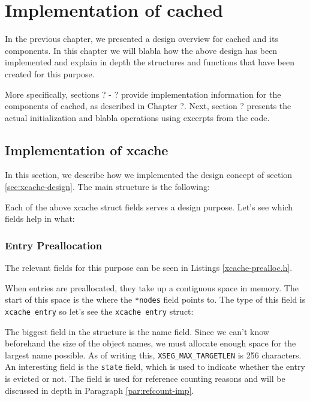 \chapter{Implementation of cached}\label{ch:cached-implementation}

In the previous chapter, we presented a design overview for cached and its 
components. In this chapter we will blabla how the above design has been
implemented and explain in depth the structures and functions that have been 
created for this purpose.

More specifically, sections ? - ? provide implementation information for the 
components of cached, as described in Chapter ?. Next, section ? presents the 
actual initialization and blabla operations using excerpts from the code.

\section{Implementation of xcache}

In this section, we describe how we implemented the design concept of section 
\ref{sec:xcache-design}. The main \xcache structure is the following:


Each of the above xcache struct fields serves a design purpose.
Let's see which fields help in what:

\subsection{Entry Preallocation}

The relevant fields for this purpose can be seen in Listings 
\ref{xcache-prealloc.h}.


When entries are preallocated, they take up a contiguous space in memory. The 
start of this space is the where the \texttt{*nodes} field points to. The type 
of this field is \texttt{xcache entry} so let's see the \texttt{xcache entry} 
struct:


The biggest field in the structure is the name field. Since we can't know 
beforehand the size of the object names, we must allocate enough space for the 
largest name possible. As of writing this, \texttt{XSEG\_MAX\_TARGETLEN} is 256 
characters. An interesting field is the \texttt{state} field, which is used to 
indicate whether the entry is evicted or not. The  
field is used for reference counting reasons and will be discussed in depth in 
Paragraph \ref{par:refcount-imp}.

